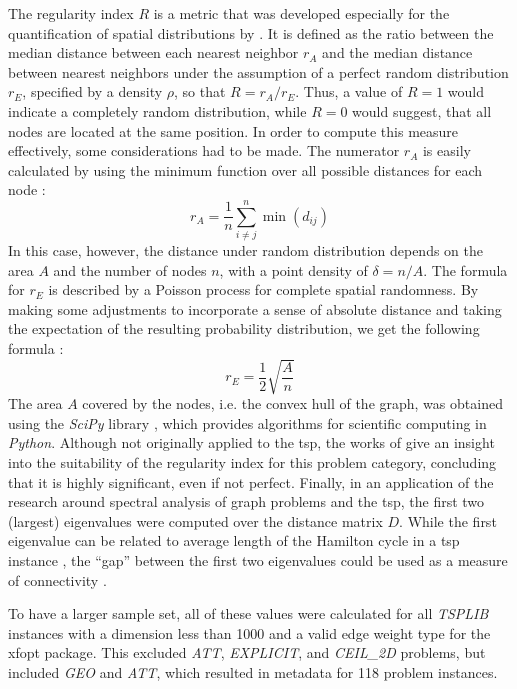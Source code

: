 The regularity index $R$ is a metric that was developed especially for the quantification of spatial distributions by \citet{clark1954distance}. It is defined as the ratio between the median distance between each nearest neighbor $r_A$ and the median distance between nearest neighbors under the assumption of a perfect random distribution $r_E$, specified by a density $\rho$, so that $R = r_A / r_E$.
Thus, a value of $R = 1$ would indicate a completely random distribution, while $R = 0$ would suggest, that all nodes are located at the same position.
In order to compute this measure effectively, some considerations had to be made.
The numerator $r_A$ is easily calculated by using the minimum function over all possible distances for each node \cite{dry2012clustering}: 
\begin{equation}
	r_A = \frac{1}{n} \sum_{i \neq j}^{n} \min(d_{ij})
\end{equation}
In this case, however, the distance under random distribution depends on the area $A$ and the number of nodes $n$, with a point density of $\delta = n/A$. The formula for $r_E$ is described by a Poisson process for complete spatial randomness. By making some adjustments to incorporate a sense of absolute distance and taking the expectation of the resulting probability distribution, we get the following formula \cite{dry2012clustering}:
\begin{equation}
	r_E = \frac{1}{2} \sqrt{\frac{A}{n}}
\end{equation}
The area $A$ covered by the nodes, i.e. the convex hull of the graph, was obtained using the \textit{SciPy} library \cite{2020SciPy-NMeth}, which provides algorithms for scientific computing in \textit{Python}.
Although not originally applied to the \gls{tsp}, the works of \citet{dry2012clustering, cricsan2021randomness} give an insight into the suitability of the regularity index for this problem category, concluding that it is highly significant, even if not perfect. Finally, in an application of the research around spectral analysis of graph problems and the \gls{tsp}, the first two (largest) eigenvalues were computed over the distance matrix $D$. While the first eigenvalue can be related to average length of the Hamilton cycle in a \gls{tsp} instance \cite{cvetkovic2018traveling}, the \enquote{gap} between the first two eigenvalues could be used as a measure of connectivity \cite{lovasz20071}.

To have a larger sample set, all of these values were calculated for all \textit{TSPLIB} instances with a dimension less than 1000 and a valid edge weight type for the \gls{xfopt} package. This excluded \textit{ATT}, \textit{EXPLICIT}, and \textit{CEIL\_2D} problems, but included \textit{GEO} and \textit{ATT}, which resulted in metadata for 118 problem instances.

